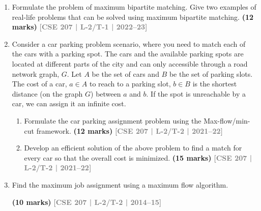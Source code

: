 \documentclass[12pt]{article}
\newcommand{\yr}[1]{\hfill\textcolor{gray}{\small\textbf{[#1]}}}
\newcommand{\mk}[1]{\textcolor{orange!70!black}{\small\textbf{(#1 marks)}}}
\begin{document}
\begin{enumerate}

  \item Formulate the problem of maximum bipartite matching. Give two examples of real-life problems that can be solved using maximum bipartite matching.
    \mk{12} \yr{CSE 207 | L-2/T-1 | 2022--23}


  \item Consider a car parking problem scenario, where you need to match each of the cars with a parking spot. The cars and the available parking spots are located at different parts of the city and can only accessible through a road network graph, $G$. Let $A$ be the set of cars and $B$ be the set of parking slots. The cost of a car, $a \in A$ to reach to a parking slot, $b \in B$ is the shortest distance (on the graph $G$) between $a$ and $b$. If the spot is unreachable by a car, we can assign it an infinite cost.
    \begin{enumerate}
      \item Formulate the car parking assignment problem using the Max-flow/min-cut framework.
        \mk{12} \yr{CSE 207 | L-2/T-2 | 2021--22}

      \item Develop an efficient solution of the above problem to find a match for every car so that the overall cost is minimized.
        \mk{15} \yr{CSE 207 | L-2/T-2 | 2021--22}
    \end{enumerate}


  \item Find the maximum job assignment using a maximum flow algorithm.

    \begin{center}
    \end{center}
    \mk{10} \yr{CSE 207 | L-2/T-2 | 2014--15}


\end{enumerate}
\end{document}
